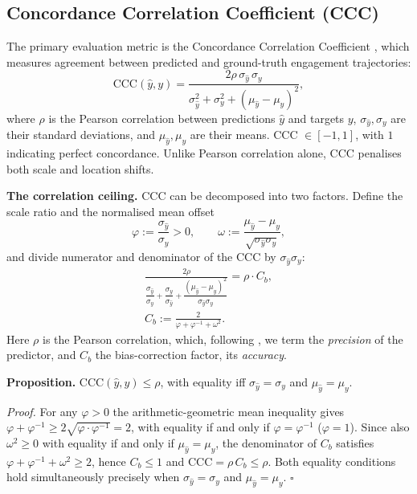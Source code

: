 \documentclass[10pt,a4paper,twocolumn]{article}
\begin{document}
	\subsection{Concordance Correlation Coefficient (CCC)}
	\label{sec:ccc}
	The primary evaluation metric is the Concordance Correlation Coefficient \cite{lin1989ccc}, which measures agreement between predicted and ground-truth engagement trajectories:
	$$
	\text{CCC}(\hat{y}, y) = \frac{2\rho\,\sigma_{\hat{y}}\,\sigma_y}{\sigma_{\hat{y}}^2 + \sigma_y^2 + (\mu_{\hat{y}} - \mu_y)^2},
	$$
	where $\rho$ is the Pearson correlation between predictions $\hat{y}$ and targets $y$, $\sigma_{\hat{y}}, \sigma_y$ are their standard deviations, and $\mu_{\hat{y}}, \mu_y$ are their means. CCC $\in [-1, 1]$, with $1$ indicating perfect concordance. Unlike Pearson correlation alone, CCC penalises both scale and location shifts.
	
	\textbf{The correlation ceiling.} CCC can be decomposed into two factors. Define the scale ratio and the normalised mean offset
	$$\varphi := \frac{\sigma_{\hat{y}}}{\sigma_y} > 0, \qquad \omega := \frac{\mu_{\hat{y}} - \mu_y}{\sqrt{\sigma_{\hat{y}}\sigma_y}},$$
	and divide numerator and denominator of the CCC by $\sigma_{\hat{y}}\sigma_y$:
	$$\begin{gathered}
	\frac{2\rho}{\dfrac{\sigma_{\hat{y}}}{\sigma_y} + \dfrac{\sigma_y}{\sigma_{\hat{y}}}
	+ \dfrac{(\mu_{\hat{y}}-\mu_y)^2}{\sigma_{\hat{y}}\sigma_y}}
	= \rho \cdot C_b, \\
	C_b := \frac{2}{\varphi + \varphi^{-1} + \omega^{2}} . \end{gathered}$$
	Here $\rho$ is the Pearson correlation, which, following \cite{lin1989ccc}, we term the \emph{precision} of the predictor, and $C_b$ the bias-correction factor, its \emph{accuracy}.
	
	\textbf{Proposition.} $\text{CCC}(\hat{y},y) \le \rho$, with equality iff $\sigma_{\hat{y}} = \sigma_y$ and $\mu_{\hat{y}} = \mu_y$.
	
	\textit{Proof.} For any $\varphi > 0$ the arithmetic-geometric mean inequality gives $\varphi + \varphi^{-1} \ge 2\sqrt{\varphi \cdot \varphi^{-1}} = 2$, with equality if and only if $\varphi = \varphi^{-1}$ ($\varphi = 1$). Since also $\omega^2 \ge 0$ with equality if and only if $\mu_{\hat{y}} = \mu_y$, the denominator of $C_b$ satisfies $\varphi + \varphi^{-1} + \omega^2 \ge 2$, hence $C_b \le 1$ and $\text{CCC} = \rho\,C_b \le \rho$. Both equality conditions hold simultaneously precisely when $\sigma_{\hat{y}} = \sigma_y$ and $\mu_{\hat{y}} = \mu_y$. $\square$
	
\end{document}
